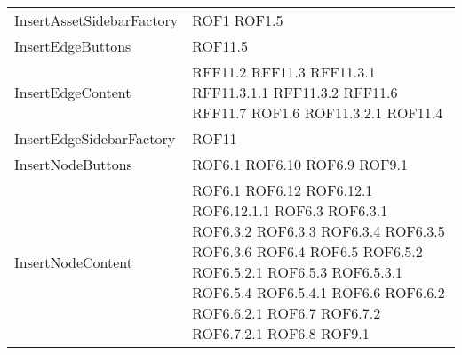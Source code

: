 \begin{longtable}{p{5cm}!{\VRule[1pt]}p{2.5cm}}
		InsertAssetSidebarFactory & ROF1 \newline ROF1.5\\
		InsertEdgeButtons & ROF11.5\\
		InsertEdgeContent & RFF11.2 \newline RFF11.3 \newline RFF11.3.1 \newline RFF11.3.1.1 \newline RFF11.3.2 \newline RFF11.6 \newline RFF11.7 \newline ROF1.6 \newline ROF11.3.2.1 \newline ROF11.4\\
		InsertEdgeSidebarFactory & ROF11\\
		InsertNodeButtons & ROF6.1 \newline ROF6.10 \newline ROF6.9 \newline ROF9.1\\
		InsertNodeContent & ROF6.1 \newline ROF6.12 \newline ROF6.12.1 \newline ROF6.12.1.1 \newline ROF6.3 \newline ROF6.3.1 \newline ROF6.3.2 \newline ROF6.3.3 \newline ROF6.3.4 \newline ROF6.3.5 \newline ROF6.3.6 \newline ROF6.4 \newline ROF6.5 \newline ROF6.5.2 \newline ROF6.5.2.1 \newline ROF6.5.3 \newline ROF6.5.3.1 \newline ROF6.5.4 \newline ROF6.5.4.1 \newline ROF6.6 \newline ROF6.6.2 \newline ROF6.6.2.1 \newline ROF6.7 \newline ROF6.7.2 \newline ROF6.7.2.1 \newline ROF6.8 \newline ROF9.1\\

\end{longtable}

